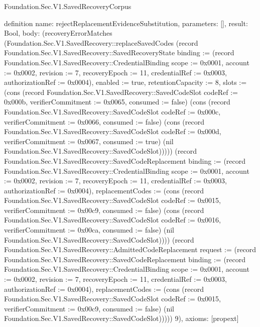 \begin{lexlean}{Foundation.Sec.V1.SavedRecoveryCorpus}
\begin{semanticmodule}
definition{
  name: rejectReplacementEvidenceSubstitution,
  parameters: [],
  result: Bool,
  body: (recoveryErrorMatches (Foundation.Sec.V1.SavedRecovery::replaceSavedCodes (record Foundation.Sec.V1.SavedRecovery::SavedRecoveryState {binding := (record Foundation.Sec.V1.SavedRecovery::CredentialBinding {scope := 0x0001, account := 0x0002, revision := 7, recoveryEpoch := 11, credentialRef := 0x0003, authorizationRef := 0x0004}), enabled := true, retentionCapacity := 8, slots := (cons (record Foundation.Sec.V1.SavedRecovery::SavedCodeSlot {codeRef := 0x000b, verifierCommitment := 0x0065, consumed := false}) (cons (record Foundation.Sec.V1.SavedRecovery::SavedCodeSlot {codeRef := 0x000c, verifierCommitment := 0x0066, consumed := false}) (cons (record Foundation.Sec.V1.SavedRecovery::SavedCodeSlot {codeRef := 0x000d, verifierCommitment := 0x0067, consumed := true}) (nil Foundation.Sec.V1.SavedRecovery::SavedCodeSlot))))}) (record Foundation.Sec.V1.SavedRecovery::SavedCodeReplacement {binding := (record Foundation.Sec.V1.SavedRecovery::CredentialBinding {scope := 0x0001, account := 0x0002, revision := 7, recoveryEpoch := 11, credentialRef := 0x0003, authorizationRef := 0x0004}), replacementCodes := (cons (record Foundation.Sec.V1.SavedRecovery::SavedCodeSlot {codeRef := 0x0015, verifierCommitment := 0x00c9, consumed := false}) (cons (record Foundation.Sec.V1.SavedRecovery::SavedCodeSlot {codeRef := 0x0016, verifierCommitment := 0x00ca, consumed := false}) (nil Foundation.Sec.V1.SavedRecovery::SavedCodeSlot)))}) (record Foundation.Sec.V1.SavedRecovery::AdmittedCodeReplacement {request := (record Foundation.Sec.V1.SavedRecovery::SavedCodeReplacement {binding := (record Foundation.Sec.V1.SavedRecovery::CredentialBinding {scope := 0x0001, account := 0x0002, revision := 7, recoveryEpoch := 11, credentialRef := 0x0003, authorizationRef := 0x0004}), replacementCodes := (cons (record Foundation.Sec.V1.SavedRecovery::SavedCodeSlot {codeRef := 0x0015, verifierCommitment := 0x00c9, consumed := false}) (nil Foundation.Sec.V1.SavedRecovery::SavedCodeSlot))})})) 9),
  axioms: [propext]
}


\end{semanticmodule}
\end{lexlean}
